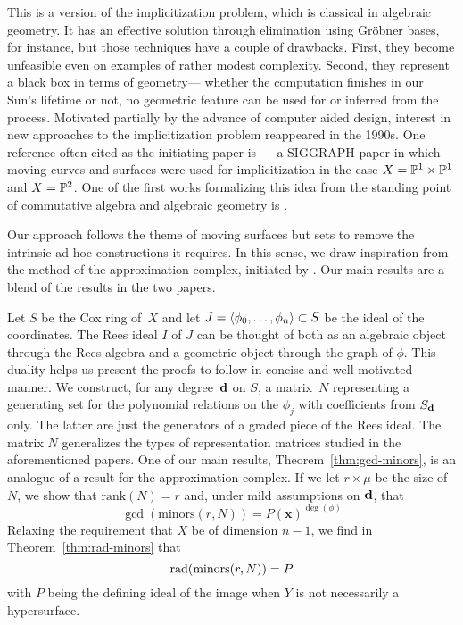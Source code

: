 \documentclass[fleqn,reqno]{amsart}
\begin{document}
\begin{paragraf*}
This is a version of the implicitization problem, which is classical in algebraic geometry.
It has an effective solution through elimination using Gr\"obner bases, for instance,
but those techniques have a couple of drawbacks.
First, they become unfeasible even on examples of rather modest complexity.
Second, they represent a black box in terms of geometry---%
whether the computation finishes in our Sun's lifetime or not,
no geometric feature can be used for or inferred from the process.
Motivated partially by the advance of computer aided design,
interest in new approaches to the implicitization problem
reappeared in the 1990s.
One reference often cited as the initiating paper is \cite{SC-95}---%
a SIGGRAPH paper in which moving curves and surfaces were used for implicitization
in the case $X=\mathbb{P}^1\times\mathbb{P}^1$ and $X=\mathbb{P}^2$.
One of the first works formalizing this idea from the standing point
of commutative algebra and algebraic geometry is \citet{CGZ-00}.
\end{paragraf*}

\begin{paragraf*}
Our approach follows the theme of moving surfaces but sets to remove the intrinsic
ad-hoc constructions it requires.
In this sense,
we draw inspiration from the method of the approximation complex,
initiated by \citet{BJ-03}.
Our main results are a blend of the results in the two papers.

Let $S$ be the Cox ring of~$X$ and
let $J=\langle\phi_0,\ldots,\phi_n\rangle\subset S$ be the ideal of the coordinates.
The Rees ideal $I$ of $J$ can be thought of both as
an algebraic object through the Rees algebra and
a geometric object through the graph of $\phi$.
This duality helps us present the proofs to follow in concise and well-motivated manner.
We construct, for any degree~$\mathbf d$ on $S$,
a matrix~$N$ representing a generating set for the polynomial relations on the $\phi_j$
with coefficients from $S_\mathbf d$ only.
The latter are just the generators of a graded piece of the Rees ideal.
The matrix $N$ generalizes the types of representation matrices
studied in the aforementioned papers.
One of our main results, Theorem~\ref{thm:gcd-minors},
is an analogue of a result for the approximation complex.
If we let $r\times\mu$ be the size of $N$,
we show that $\text{rank}(N)=r$ and,
under mild assumptions on $\mathbf d$, that
\[
	\gcd(\text{minors}(r,N))=P(\mathbf x)^{\deg(\phi)}
\]
Relaxing the requirement that $X$ be of dimension $n-1$,
we find in Theorem~\ref{thm:rad-minors} that
\[
	\operatorname{rad}(\text{minors}(r,N))=P
\]
with $P$ being the defining ideal of the image when $Y$ is not necessarily a hypersurface.
\end{paragraf*}
\end{document}

